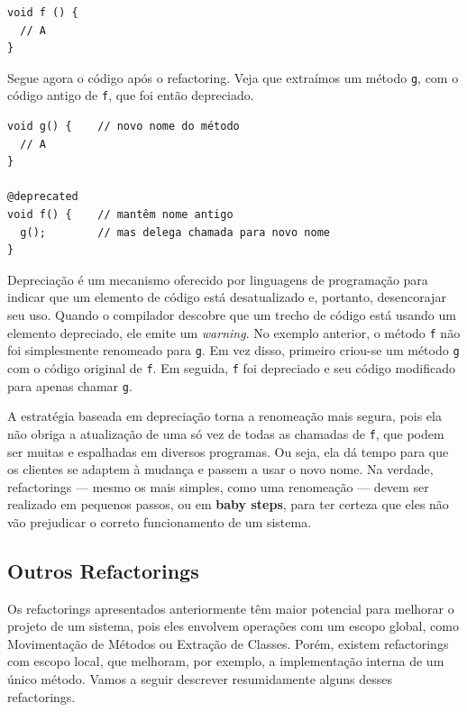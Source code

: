 \documentclass[
  11pt,
  twoside]{book}
\newcommand{\passthrough}[1]{#1}
\begin{document}
\begin{lstlisting}
void f () {
  // A
}
\end{lstlisting}

Segue agora o código após o refactoring. Veja que extraímos um método
\passthrough{\lstinline!g!}, com o código antigo de
\passthrough{\lstinline!f!}, que foi então depreciado.

\begin{lstlisting}
void g() {    // novo nome do método
  // A
}

@deprecated
void f() {    // mantêm nome antigo
  g();        // mas delega chamada para novo nome
}
\end{lstlisting}

Depreciação é um mecanismo oferecido por linguagens de programação para
indicar que um elemento de código está desatualizado e, portanto,
desencorajar seu uso. Quando o compilador descobre que um trecho de
código está usando um elemento depreciado, ele emite um \emph{warning}.
No exemplo anterior, o método \passthrough{\lstinline!f!} não foi
simplesmente renomeado para \passthrough{\lstinline!g!}. Em vez disso,
primeiro criou-se um método \passthrough{\lstinline!g!} com o código
original de \passthrough{\lstinline!f!}. Em seguida,
\passthrough{\lstinline!f!} foi depreciado e seu código modificado para
apenas chamar \passthrough{\lstinline!g!}.

A estratégia baseada em depreciação torna a renomeação mais segura, pois
ela não obriga a atualização de uma só vez de todas as chamadas de
\passthrough{\lstinline!f!}, que podem ser muitas e espalhadas em
diversos programas. Ou seja, ela dá tempo para que os clientes se
adaptem à mudança e passem a usar o novo nome. Na verdade, refactorings
--- mesmo os mais simples, como uma renomeação --- devem ser realizado
em pequenos passos, ou em \textbf{baby steps}, para ter certeza que eles
não vão prejudicar o correto funcionamento de um sistema.

\hypertarget{outros-refactorings}{%
\subsection{Outros Refactorings}\label{outros-refactorings}}

Os refactorings apresentados anteriormente têm maior potencial para
melhorar o projeto de um sistema, pois eles envolvem operações com um
escopo global, como Movimentação de Métodos ou Extração de Classes.
Porém, existem refactorings com escopo local, que melhoram, por exemplo,
a implementação interna de um único método. Vamos a seguir descrever
resumidamente alguns desses refactorings.
\end{document}
